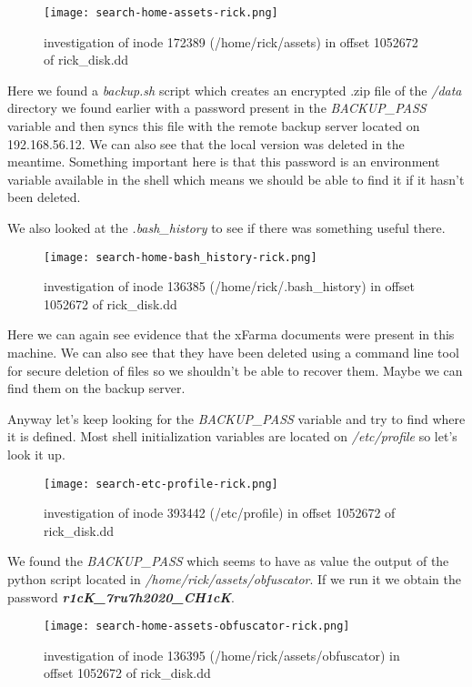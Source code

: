 \begin{figure}[H]
    \texttt{[image: search-home-assets-rick.png]}
    \centering
    \caption{investigation of inode 172389 (/home/rick/assets) in offset 1052672 of rick\_disk.dd}
\end{figure}

Here we found a \textit{backup.sh} script which creates an encrypted .zip file of the \textit{/data} directory we found earlier with a password present in the \textit{BACKUP\_PASS} variable and then syncs this file with the remote backup server located on 192.168.56.12. We can also see that the local version was deleted in the meantime. Something important here is that this password is an environment variable available in the shell which means we should be able to find it if it hasn't been deleted.

We also looked at the \textit{.bash\_history} to see if there was something useful there.

\begin{figure}[H]
    \texttt{[image: search-home-bash\_history-rick.png]}
    \centering
    \caption{investigation of inode 136385 (/home/rick/.bash\_history) in offset 1052672 of rick\_disk.dd}
\end{figure}

Here we can again see evidence that the xFarma documents were present in this machine. We can also see that they have been deleted using a command line tool for secure deletion of files so we shouldn't be able to recover them. Maybe we can find them on the backup server.

Anyway let's keep looking for the \textit{BACKUP\_PASS} variable and try to find where it is defined. Most shell initialization variables are located on \textit{/etc/profile} so let's look it up.

\begin{figure}[H]
    \texttt{[image: search-etc-profile-rick.png]}
    \centering
    \caption{investigation of inode 393442 (/etc/profile) in offset 1052672 of rick\_disk.dd}
\end{figure}

We found the \textit{BACKUP\_PASS} which seems to have as value the output of the python script located in \textit{/home/rick/assets/obfuscator}. If we run it we obtain the password \textit{\textbf{r1cK\_7ru7h2020\_CH1cK}}.

\begin{figure}[H]
    \texttt{[image: search-home-assets-obfuscator-rick.png]}
    \centering
    \caption{investigation of inode 136395 (/home/rick/assets/obfuscator) in offset 1052672 of rick\_disk.dd}
\end{figure}

